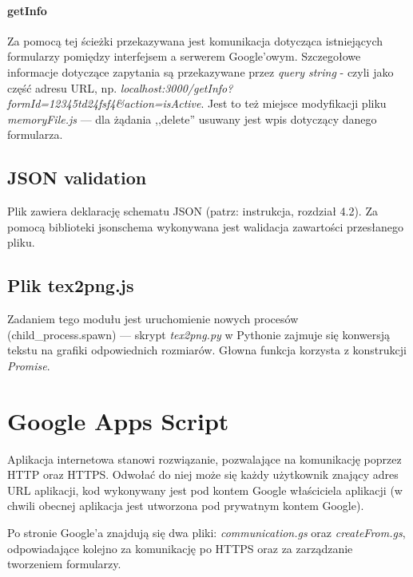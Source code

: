 \paragraph{getInfo} Za pomocą tej ścieżki  przekazywana jest komunikacja dotycząca istniejących formularzy pomiędzy interfejsem a serwerem Google'owym. Szczegołowe informacje dotyczące zapytania są przekazywane przez \textit{query string} - czyli jako część adresu URL, np. \textit{localhost:3000/getInfo?formId=12345td24fsf4\&action=isActive}. Jest to też miejsce modyfikacji pliku \textit{memoryFile.js} --- dla żądania ,,delete'' usuwany jest wpis dotyczący danego formularza.
\subsection{JSON validation} Plik zawiera deklarację schematu JSON (patrz: instrukcja, rozdział 4.2). Za pomocą biblioteki jsonschema wykonywana jest walidacja zawartości przesłanego pliku.
\subsection{Plik tex2png.js} Zadaniem tego modułu jest uruchomienie nowych procesów (child\_process.spawn)  --- skrypt \textit{tex2png.py} w Pythonie zajmuje się konwersją tekstu na grafiki odpowiednich rozmiarów. Głowna funkcja korzysta z konstrukcji \textit{Promise}.

\section{Google Apps Script}
Aplikacja internetowa stanowi rozwiązanie, pozwalające na komunikację poprzez HTTP oraz HTTPS. Odwołać do niej może się każdy użytkownik znający adres URL aplikacji, kod wykonywany jest pod kontem Google właściciela aplikacji (w chwili obecnej aplikacja jest utworzona pod prywatnym kontem Google).

\ind Po stronie Google'a znajdują się dwa pliki: \textit{communication.gs} oraz \textit{createFrom.gs}, odpowiadające kolejno za komunikację po HTTPS oraz za zarządzanie tworzeniem formularzy. 

